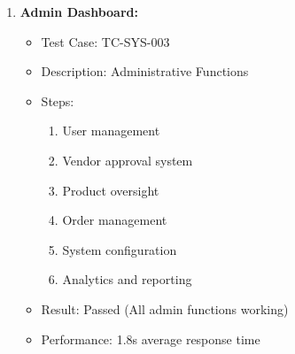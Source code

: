 \begin{enumerate}
    \item \textbf{Admin Dashboard:}
    \begin{itemize}
        \item Test Case: TC-SYS-003
        \item Description: Administrative Functions
        \item Steps:
        \begin{enumerate}
            \item User management
            \item Vendor approval system
            \item Product oversight
            \item Order management
            \item System configuration
            \item Analytics and reporting
        \end{enumerate}
        \item Result: Passed (All admin functions working)
        \item Performance: 1.8s average response time
    \end{itemize}
\end{enumerate}

